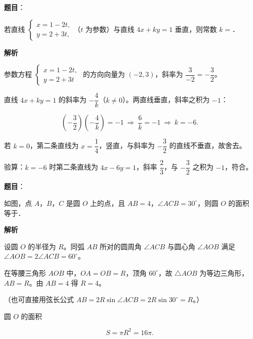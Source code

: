 \begin{answer}

\textbf{题目}：

若直线 $\begin{cases}x=1-2t,\\ y=2+3t,\end{cases}$（$t$ 为参数）与直线 $4x+ky=1$ 垂直，则常数 $k=$\gkblank{}．

\textbf{解析}

参数方程 $\begin{cases}x=1-2t,\\ y=2+3t\end{cases}$ 的方向向量为 $(-2,3)$，斜率为 $\dfrac{3}{-2}=-\dfrac32$。

直线 $4x+ky=1$ 的斜率为 $-\dfrac4k$（$k\neq0$）。两直线垂直，斜率之积为 $-1$：

\nopagebreak[4]
\[\left(-\frac32\right)\left(-\frac4k\right)=-1\ \Longrightarrow\ \frac{6}{k}=-1\ \Longrightarrow\ k=-6.\]

若 $k=0$，第二条直线为 $x=\dfrac14$，竖直，与斜率为 $-\dfrac32$ 的直线不垂直，故舍去。

验算：$k=-6$ 时第二条直线为 $4x-6y=1$，斜率 $\dfrac23$，与 $-\dfrac32$ 之积为 $-1$，符合。


\end{answer}
\begin{answer}

\textbf{题目}：

如图，点 $A$，$B$，$C$ 是圆 $O$ 上的点，且 $AB=4$，$\angle ACB=30^\circ$，则圆 $O$ 的面积等于\gkblank{}．
\nopagebreak[4]
\begin{center}\end{center}
\nopagebreak[4]
\textbf{解析}

设圆 $O$ 的半径为 $R$。同弧 $AB$ 所对的圆周角 $\angle ACB$ 与圆心角 $\angle AOB$ 满足 $\angle AOB=2\angle ACB=60^\circ$。

在等腰三角形 $AOB$ 中，$OA=OB=R$，顶角 $60^\circ$，故 $\triangle AOB$ 为等边三角形，$AB=R$。由 $AB=4$ 得 $R=4$。

（也可直接用弦长公式 $AB=2R\sin\angle ACB=2R\sin30^\circ=R$。）

圆 $O$ 的面积

\nopagebreak[4]
\[S=\pi R^2=16\pi.\]


\end{answer}
